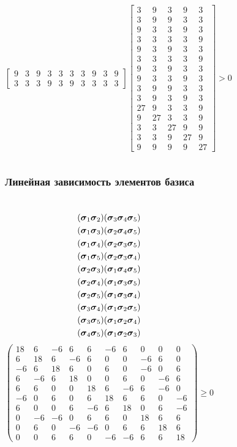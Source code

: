 \documentclass{beamer}
\begin{document}
\begin{frame}
\begin{columns}[c]
$$\begin{bmatrix}
9& 3& 9& 3& 3& 3& 3& 9& 3& 9\\
3& 3& 3& 9& 3& 9& 3& 3& 3& 3
\end{bmatrix}
\begin{bmatrix}
 3& 9& 3& 9& 3\\
 3& 9& 9& 3& 3\\
 9& 3& 3& 9& 3\\
 3& 3& 3& 3& 9\\
 9& 3& 9& 3& 3\\
 3& 3& 3& 3& 9\\
 9& 3& 9& 3& 3\\
 9& 3& 3& 9& 3\\
 3& 9& 9& 3& 3\\
 3& 9& 3& 9& 3\\
27& 9& 3& 3& 9\\
9& 27& 3& 3& 9\\
3& 3& 27& 9& 9\\
3& 3& 9& 27& 9\\
9& 9& 9& 9& 27
\end{bmatrix}>0$$
\end{columns}
\normalsize
\end{frame}
\begin{frame}
\frametitle{Линейная зависимость элементов базиса}
\small
\begin{columns}[c] %
$$\begin{gathered}
(\cc_1\cc_2) (\cc_3\cc_4\cc_5)\\
(\cc_1\cc_3) (\cc_2\cc_4\cc_5)\\
(\cc_1\cc_4) (\cc_2\cc_3\cc_5)\\
(\cc_1\cc_5) (\cc_2\cc_3\cc_4)\\
(\cc_2\cc_3) (\cc_1\cc_4\cc_5)\\
(\cc_2\cc_4) (\cc_1\cc_3\cc_5)\\
(\cc_2\cc_5) (\cc_1\cc_3\cc_4)\\
(\cc_3\cc_4) (\cc_1\cc_2\cc_5)\\
(\cc_3\cc_5) (\cc_1\cc_2\cc_4)\\
(\cc_4\cc_5) (\cc_1\cc_2\cc_3)
\end{gathered}$$
$$\begin{pmatrix}
18& 6& -6& 6& 6& -6& 6& 0& 0& 0\\
6& 18& 6& -6& 6& 0& 0& -6& 6& 0\\
-6& 6& 18& 6& 0& 6& 0& -6& 0& 6\\
6& -6& 6& 18& 0& 0& 6& 0& -6& 6\\
6& 6& 0& 0& 18& 6& -6& 6& -6& 0\\
-6& 0& 6& 0& 6& 18& 6& 6& 0& -6\\
6& 0& 0& 6& -6& 6& 18& 0& 6& -6\\
0& -6& -6& 0& 6& 6& 0& 18& 6& 6\\
0& 6& 0& -6& -6& 0& 6& 6& 18& 6\\
0& 0& 6& 6& 0& -6& -6& 6& 6& 18
\end{pmatrix}\geqslant 0$$
\end{columns}
\normalsize
\end{frame}
\end{document}
